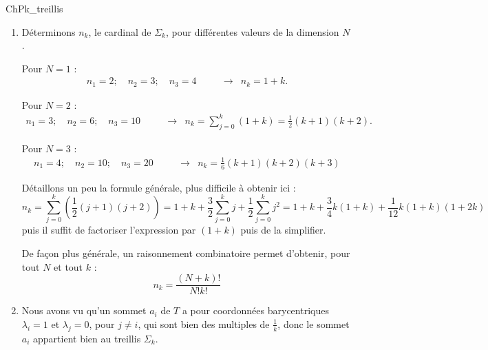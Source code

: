 \begin{corrige}{ChPk_treillis}

\begin{enumerate}
\item Déterminons $n_k$, le cardinal de $\Sigma_k$, pour différentes valeurs de la dimension $N$.

Pour $N = 1$ :
\begin{eqnarray*}
n_1 = 2 ; \quad n_2 = 3 ; \quad n_3 = 4 \qquad &\longrightarrow& n_k = 1 + k.
\end{eqnarray*}

Pour $N = 2$ :
\begin{eqnarray*}
n_1 = 3 ; \quad n_2 = 6 ; \quad n_3 = 10 \qquad &\longrightarrow& n_k = \sum_{j=0}^k (1+k) = \frac12 (k+1)(k+2).
\end{eqnarray*}

Pour $N = 3$ :
\begin{eqnarray*}
n_1 = 4 ; \quad n_2 = 10 ; \quad n_3 = 20 \qquad &\longrightarrow& n_k = \frac16 (k+1) (k+2)  (k+3) \end{eqnarray*}

Détaillons un peu la formule générale, plus difficile à obtenir ici :
\[
n_k = \sum_{j=0}^k \left (\frac12 (j+1) (j+2) \right ) =
1+k + \frac32 \sum_{j=0}^k j + \frac12 \sum_{j=0}^k j^2
= 1 + k + \frac34 k ( 1 + k) + \frac1{12} k ( 1 + k ) ( 1 + 2k )
\]
puis il suffit de factoriser l'expression par $(1+k)$ puis de la simplifier.

\medskip

De façon plus générale, un raisonnement combinatoire permet d'obtenir, pour tout $N$ et tout $k$ :
\[
n_k = \frac{(N+k)!}{N!k!}
\]


\item Nous avons vu qu'un sommet $a_i$ de $T$ a pour coordonnées barycentriques $\lambda_i = 1$ et $\lambda_j = 0$, pour $j\neq i$, qui sont bien des multiples de $\frac1k$, donc le sommet $a_i$ appartient bien au treillis $\Sigma_k$.
\end{enumerate}

\end{corrige}

\medskip

